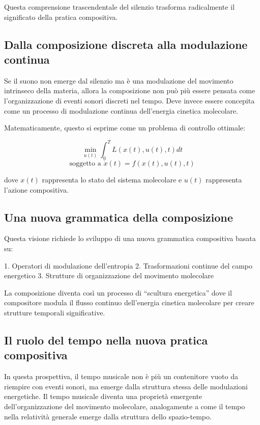 \documentclass[a4paper,11pt]{article}
\begin{document}
Questa comprensione trascendentale del silenzio trasforma radicalmente
il significato della pratica compositiva.

\subsection{Dalla composizione discreta alla modulazione
continua}\label{dalla-composizione-discreta-alla-modulazione-continua}

Se il suono non emerge dal silenzio ma è una modulazione del movimento
intrinseco della materia, allora la composizione non può più essere
pensata come l'organizzazione di eventi sonori discreti nel tempo. Deve
invece essere concepita come un processo di modulazione continua
dell'energia cinetica molecolare.

Matematicamente, questo si esprime come un problema di controllo
ottimale:

\[\min_{u(t)} \int_0^T L(x(t), u(t), t)dt\]
\[\text{soggetto a } \dot{x}(t) = f(x(t), u(t), t)\]

dove \(x(t)\) rappresenta lo stato del sistema molecolare e \(u(t)\)
rappresenta l'azione compositiva.

\subsection{Una nuova grammatica della
composizione}\label{una-nuova-grammatica-della-composizione}

Questa visione richiede lo sviluppo di una nuova grammatica compositiva
basata su:

1. Operatori di modulazione dell'entropia 2. Trasformazioni continue del
campo energetico 3. Strutture di organizzazione del movimento molecolare

La composizione diventa così un processo di ``scultura energetica'' dove
il compositore modula il flusso continuo dell'energia cinetica
molecolare per creare strutture temporali significative.

\subsection{Il ruolo del tempo nella nuova pratica
compositiva}\label{il-ruolo-del-tempo-nella-nuova-pratica-compositiva}

In questa prospettiva, il tempo musicale non è più un contenitore vuoto
da riempire con eventi sonori, ma emerge dalla struttura stessa delle
modulazioni energetiche. Il tempo musicale diventa una proprietà
emergente dell'organizzazione del movimento molecolare, analogamente a
come il tempo nella relatività generale emerge dalla struttura dello
spazio-tempo.
\end{document}
